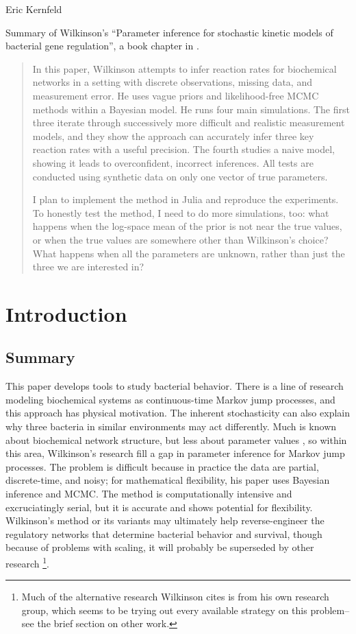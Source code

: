 \documentclass{article}
\begin{document}
Eric Kernfeld

Summary of Wilkinson's ``Parameter inference for stochastic kinetic models of bacterial gene regulation'', a book chapter in \cite{Bernardo2012}.

\begin{abstract}
In this paper, Wilkinson attempts to infer reaction rates for biochemical networks in a setting with discrete observations, missing data, and measurement error. He uses vague priors and likelihood-free MCMC methods within a Bayesian model. He runs four main simulations. The first three iterate through successively more difficult and realistic measurement models, and they show the approach can accurately infer three key reaction rates with a useful precision. The fourth studies a naive model, showing it leads to overconfident, incorrect inferences. All tests are conducted using synthetic data on only one vector of true parameters.

I plan to implement the method in Julia and reproduce the experiments. To honestly test the method, I need to do more simulations, too: what happens when the log-space mean of the prior is not near the true values, or when the true values are somewhere other than Wilkinson's choice? What happens when all the parameters are unknown, rather than just the three we are interested in?
\end{abstract}


\section{Introduction}
\subsection{Summary}
This paper develops tools to study bacterial behavior. There is a line of research modeling biochemical systems as continuous-time Markov jump processes, and this approach has physical motivation. The inherent stochasticity can also explain why three bacteria in similar environments may act differently. Much is known about biochemical network structure, but less about parameter values \cite{klipp2004inferring}, so within this area, Wilkinson's research fill a gap in parameter inference for Markov jump processes. The problem is difficult because in practice the data are partial, discrete-time, and noisy; for mathematical flexibility, his paper uses Bayesian inference and MCMC. The method is computationally intensive and excruciatingly serial, but it is accurate and shows potential for flexibility. Wilkinson's method or its variants may ultimately help reverse-engineer the regulatory networks that determine bacterial behavior and survival, though because of problems with scaling, it will probably be superseded by other research \footnote{Much of the alternative research Wilkinson cites is from his own research group, which seems to be trying out every available strategy on this problem--see the brief section on other work.}.
\end{document}
